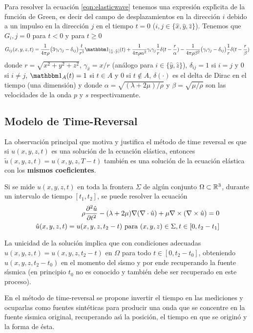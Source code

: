 Para resolver la ecuaci\'on \eqref{eqn:elasticwave} tenemos una expresi\'on expl\'{\i}cita
de la funci\'on de Green, es decir del campo de desplazamientos en la direcci\'on $i$
debido a un impulso en la direcci\'on $j$ en el tiempo $t=0$ ($i,j\in\{\hat{x},\hat{y},\hat{z}\}$).
Tenemos que $G_i,j=0$ para $t<0$ y para $t\geq0$
$$G_{ij}(x,y,z,t)=
\frac{1}{4\pi\rho}\big(3\gamma_i\gamma_j-\delta_{ij}\big)\frac{t}{r^3}\one_{[\frac{r}{\alpha},\frac{r}{\beta}]}(t)
+\frac{1}{4\pi\rho\alpha^2}\gamma_i\gamma_j\frac{1}{r}\delta(t-\frac{r}{\alpha})
-\frac{1}{4\pi\rho\beta^2}\big(\gamma_i\gamma_j-\delta_{ij}\big)\frac{1}{r}\delta(t-\frac{r}{\beta})$$
donde $r=\sqrt{x^2+y^2+z^2}$, $\gamma_{\hat{x}}=x/r$ (an\'alogo para $i\in\{\hat{y},\hat{z}\}$),
$\delta_{ij}=1$ si $i=j$ y $0$ si $i\neq j$, $\one_A(t)=1$ si $t\in A$ y $0$ si $t\notin A$, $\delta(\cdot)$
es el delta de Dirac en el tiempo (una dimensi\'on) y donde $\alpha=\sqrt{(\lambda+2\mu)/\rho}$ y
$\beta=\sqrt{\mu/\rho}$ son las velocidades de la onda $p$ y $s$ respectivamente.

\subsection{Modelo de Time-Reversal}

La observaci\'on principal que motiva y justifica el m\'etodo de time
reversal es que si $u(x,y,z,t)$ es una soluci\'on de la ecuaci\'on
el\'astica, entonces $\tilde{u}(x,y,z,t)=u(x,y,z,T-t)$ tambi\'en es
una soluci\'on de la ecuaci\'on el\'astica con los {\bf mismos coeficientes}.

Si se mide $u(x,y,z,t)$ en toda la frontera
$\Sigma$ de alg\'un conjunto $\Omega\subset\mathbb{R}^3$, durante un intervalo de
tiempo $[t_1,t_2]$,  se puede resolver la ecuaci\'on
\begin{align*}
\rho\frac{\partial^2 \hat{u}}{\partial t^2}-(\lambda+2\mu)\nabla(\nabla\cdot \hat{u})+\mu\nabla\times(\nabla\times \hat{u})=0\\
\hat{u}(x,y,z,t)=u(x,y,z,t_2-t) \textnormal{ para } (x,y,z)\in\Sigma, t\in[0,t_2-t_1]
\end{align*}

La unicidad de la soluci\'on implica que con condiciones adecuadas $\hat{u}(x,y,z,t)=u(x,y,z,t_2-t)$  en $\Omega$
para todo $t\in[0,t_2-t_0]$, obteniendo $u(x,y,z,t_2-t_0)$ en el momento del s\'{\i}smo
y por ende recuperando la fuente s\'{\i}smica (en principio
$t_0$ no es conocido y tambi\'en debe ser recuperado en este
proceso).

En el m\'etodo de time-reversal se propone invertir el tiempo en las mediciones
 y ocuparlas como fuentes sint\'eticas para producir una onda que se concentre
en la fuente s\'{\i}smica original, recuperando as\'{\i} la posici\'on, el tiempo en
que se origin\'o y la forma de \'esta.


